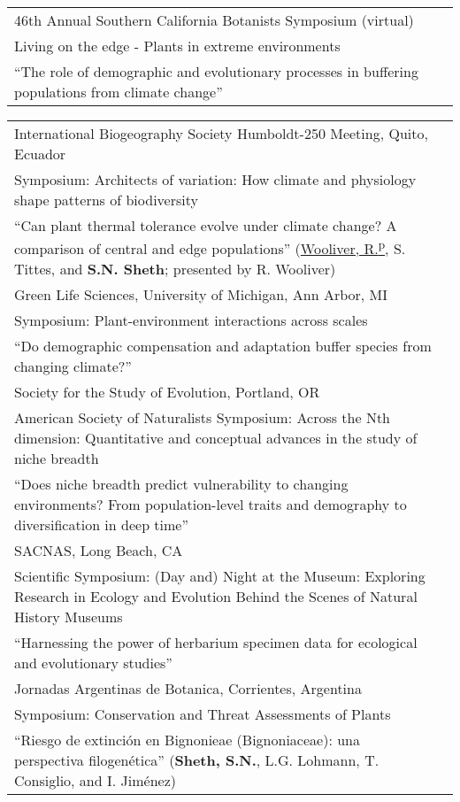 \documentclass[11pt,english]{article}
\providecommand{\tabularnewline}{\\}
\begin{document}
\begin{tabularx}{\textwidth}{@{}>{\raggedright}p{5.25in}
>{\raggedleft}X@{}}
46th Annual Southern California Botanists Symposium (virtual) & 2020 \tabularnewline
\addtolength{\leftskip}{5ex} Living on the edge - Plants in extreme environments \tabularnewline
\addtolength{\leftskip}{5ex} ``The role of demographic and evolutionary processes in buffering populations from climate change''
\tabularnewline

\end{tabularx}

\renewcommand{\arraystretch}{1.2}
\begin{tabularx}{\textwidth}{@{}>{\raggedright}p{5.25in} >{\raggedleft}X@{}}

International Biogeography Society Humboldt-250 Meeting, Quito, Ecuador & 2019 \tabularnewline
\addtolength{\leftskip}{5ex} Symposium: Architects of variation: How climate and physiology shape patterns of biodiversity  \tabularnewline
\addtolength{\leftskip}{5ex} ``Can plant thermal tolerance evolve under climate change? A comparison of central and edge populations'' (\underline{Wooliver, R.\textsuperscript{p}}, S. Tittes, and \textbf{S.N. Sheth}; presented by R. Wooliver)
\tabularnewline

Green Life Sciences, University of Michigan, Ann Arbor, MI & 2018 \tabularnewline
\addtolength{\leftskip}{5ex} Symposium: Plant-environment interactions across scales  \tabularnewline
\addtolength{\leftskip}{5ex} ``Do demographic compensation and adaptation buffer species from changing climate?'' \tabularnewline

Society for the Study of Evolution, Portland, OR & 2017 \tabularnewline
\addtolength{\leftskip}{5ex} American Society of Naturalists Symposium: Across the Nth dimension: Quantitative and conceptual advances in the study of niche breadth  \tabularnewline
\addtolength{\leftskip}{5ex} ``Does niche breadth predict vulnerability to changing environments? From population-level traits and demography to diversification in deep time'' \tabularnewline

SACNAS, Long Beach, CA & 2016 \tabularnewline
\addtolength{\leftskip}{5ex} Scientific Symposium: (Day and) Night at the Museum: Exploring Research in Ecology and Evolution Behind the Scenes of Natural History Museums \tabularnewline
\addtolength{\leftskip}{5ex} ``Harnessing the power of herbarium specimen data for ecological and evolutionary studies'' \tabularnewline

Jornadas Argentinas de Botanica, Corrientes, Argentina & 2007 \tabularnewline
\addtolength{\leftskip}{5ex} Symposium: Conservation and Threat Assessments of Plants \tabularnewline
\addtolength{\leftskip}{5ex} ``Riesgo de extinci\'on en Bignonieae (Bignoniaceae): una perspectiva filogen\'etica'' (\textbf{Sheth, S.N.}, L.G. Lohmann, T. Consiglio, and I. Jim\'enez) \tabularnewline


\end{tabularx}
\end{document}
